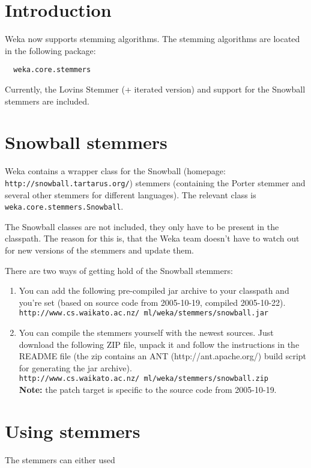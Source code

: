 
\section{Introduction}
Weka now supports stemming algorithms. The stemming algorithms are located in the following package:

\begin{verbatim}
  weka.core.stemmers
\end{verbatim}

\noindent Currently, the Lovins Stemmer (+ iterated version) and support for the Snowball stemmers are included.

\section{Snowball stemmers}
Weka contains a wrapper class for the Snowball (homepage: \texttt{http://snowball.tartarus.org/}) stemmers (containing the Porter stemmer and several other stemmers for different languages). The relevant class is \texttt{weka.core.stemmers.Snowball}.

The Snowball classes are not included, they only have to be present in the classpath. The reason for this is, that the Weka team doesn't have to watch out for new versions of the stemmers and update them.

There are two ways of getting hold of the Snowball stemmers:

\begin{enumerate}
	\item You can add the following pre-compiled jar archive to your classpath and you're set (based on source code from 2005-10-19, compiled 2005-10-22). \\
	\texttt{http://www.cs.waikato.ac.nz/~ml/weka/stemmers/snowball.jar}
	\item You can compile the stemmers yourself with the newest sources. Just download the following ZIP file, unpack it and follow the instructions in the README file (the zip contains an ANT (http://ant.apache.org/) build script for generating the jar archive). \\
	\texttt{http://www.cs.waikato.ac.nz/~ml/weka/stemmers/snowball.zip} \\
      \textbf{Note:} the patch target is specific to the source code from 2005-10-19.
\end{enumerate}

\newpage
\section{Using stemmers}
The stemmers can either used

